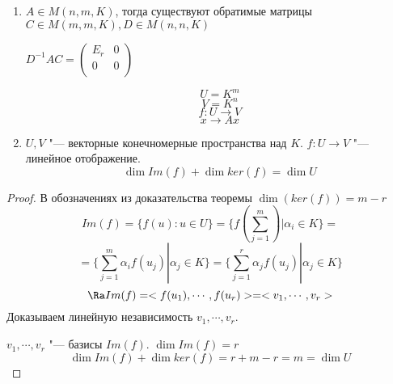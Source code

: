 \begin{conseq}
\begin{enumerate}
\item $A \in M(n, m, K)$, тогда существуют обратимые матрицы $C \in M(m, m, K), D \in M(n, n, K)$

$D^{-1}AC = 
\begin{pmatrix}
E_r&0\\
0&0\\
\end{pmatrix}$

$$U = K^{m}$$
$$V = K^n$$
$$f\colon U \to V$$
$$x \to Ax$$
\item $U, V$ "--- векторные конечномерные пространства над $K$.
$f \colon U \to V$ "--- линейное отображение. 
$$\dim Im(f) + \dim ker(f) = \dim U$$
\end{enumerate}
\end{conseq}
\begin{proof}
В обозначениях из доказательства теоремы $\dim(ker(f)) = m - r$
$$Im(f) = \{f(u)\colon u \in U\} = \{f(\sum_{j = 1}^{m})|\alpha_{i} \in K\} =$$
$$= \{\sum_{j = 1}^{m}\alpha_{i}f(u_j)| \alpha_j \in K\} = \{\sum_{j = 1}^{r}\alpha_{j}f(u_j)|\alpha_{j} \in K\} $$
$$\Ra Im(f) = <f(u_1), \cdots, f(u_r)> = <v_1, \cdots, v_r>$$
Доказываем линейную независимость $v_1, \cdots, v_r$.

$v_1, \cdots, v_r$ "--- базисы $Im(f)$.
$\dim Im(f) = r$
$$\dim Im(f) + \dim ker(f) = r + m - r = m = \dim U$$
\end{proof}
